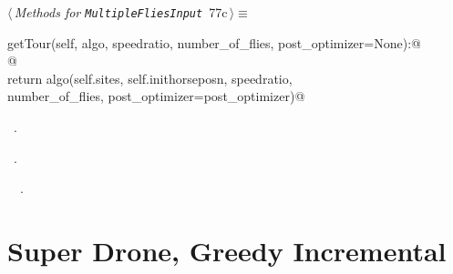 \documentclass[11.5pt]{report}
\begin{document}
\begin{flushleft} \small\label{scrap111}\raggedright\small
{} $\langle\,${\itshape Methods for \verb|MultipleFliesInput|}\nobreak\ {\footnotesize {77c}}$\,\rangle\equiv$
\vspace{-1ex}
\begin{list}{}{} \item
\mbox{}\verb@def getTour(self, algo, speedratio, number_of_flies, post_optimizer=None):@\\
\mbox{}\verb@ @\\
\mbox{}\verb@      return algo(self.sites, self.inithorseposn, speedratio, \@\\
\mbox{}\verb@                  number_of_flies, post_optimizer=post_optimizer)@\\
\mbox{}\verb@@{\NWsep}
\end{list}
\vspace{-1.5ex}
\footnotesize
\begin{list}{}{\setlength{\itemsep}{-\parsep}\setlength{\itemindent}{-\leftmargin}}
\item \NWtxtMacroDefBy\ .
\item \NWtxtMacroRefIn\ .
\item \NWtxtIdentsDefed\nobreak\  \verb@getTour@\nobreak\ .
\item{}
\end{list}
\vspace{4ex}
\end{flushleft}


\section{ Super Drone, Greedy Incremental}
\end{document}
